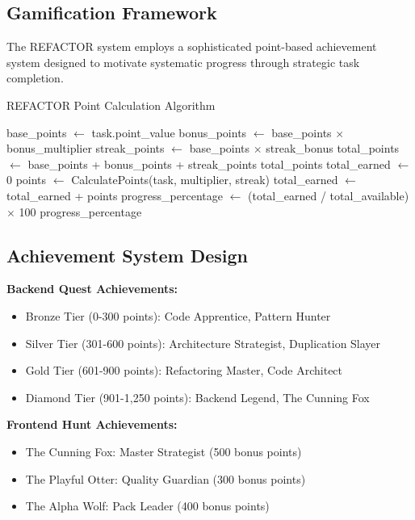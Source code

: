 \documentclass[10pt]{article}
\begin{document}
\subsection{Gamification Framework}

The REFACTOR system employs a sophisticated point-based achievement system designed to motivate systematic progress through strategic task completion.

\begin{algorithm}
\caption{REFACTOR Point Calculation Algorithm}
\begin{algorithmic}[1]
    \State base\_points $\gets$ task.point\_value
    \State bonus\_points $\gets$ base\_points $\times$ bonus\_multiplier
    \State streak\_points $\gets$ base\_points $\times$ streak\_bonus
    \State total\_points $\gets$ base\_points + bonus\_points + streak\_points
    \Return total\_points
\EndFunction
\Statex
{}
    \State total\_earned $\gets$ 0
        \State points $\gets$ CalculatePoints(task, multiplier, streak)
        \State total\_earned $\gets$ total\_earned + points
    \EndFor
    \State progress\_percentage $\gets$ (total\_earned / total\_available) $\times$ 100
    \Return progress\_percentage
\EndFunction
\end{algorithmic}
\end{algorithm}

\subsection{Achievement System Design}

\textbf{Backend Quest Achievements:}
\begin{itemize}
    \item Bronze Tier (0-300 points): Code Apprentice, Pattern Hunter
    \item Silver Tier (301-600 points): Architecture Strategist, Duplication Slayer
    \item Gold Tier (601-900 points): Refactoring Master, Code Architect
    \item Diamond Tier (901-1,250 points): Backend Legend, The Cunning Fox
\end{itemize}

\textbf{Frontend Hunt Achievements:}
\begin{itemize}
    \item The Cunning Fox: Master Strategist (500 bonus points)
    \item The Playful Otter: Quality Guardian (300 bonus points)
    \item The Alpha Wolf: Pack Leader (400 bonus points)
\end{itemize}
\end{document}
